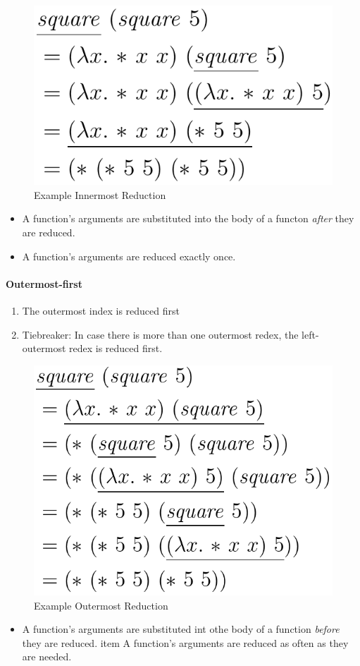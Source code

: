 \begin{figure}[H]
\centering
\includegraphics[width=0.4\linewidth]{images/lc_innermost_reduction}
\caption{Example Innermost Reduction}
\label{fig:lcinnermostreduction}
\end{figure}

\begin{itemize}
	\item A function's arguments are substituted into the body of a functon \emph{after} they are reduced.
	\item A function's arguments are reduced exactly once.
\end{itemize}

\paragraph{Outermost-first}

\begin{enumerate}
	\item The outermost index is reduced first
	\item Tiebreaker: In case there is more than one outermost redex, the left-outermost redex is reduced first.
\end{enumerate}

\begin{figure}[H]
\centering
\includegraphics[width=0.4\linewidth]{images/lc_outermost_reduction}
\caption{Example Outermost Reduction}
\label{fig:lcoutermostreduction}
\end{figure}

\begin{itemize}
	\item A function's arguments are substituted int othe body of a function \emph{before} they are reduced.
	item A function's arguments are reduced as often as they are needed.
\end{itemize}

